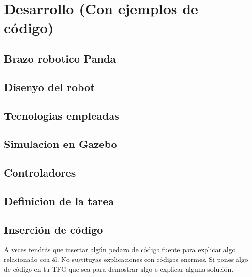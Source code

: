 
\chapter{Desarrollo (Con ejemplos de código)}
\label{desarrollo}

\section{Brazo robotico Panda}

\section{Disenyo del robot}

\section{Tecnologias empleadas}

\section{Simulacion en Gazebo}

\section{Controladores}

\section{Definicion de la tarea}


\section{Inserción de código}
A veces tendrás que insertar algún pedazo de código fuente para explicar algo relacionado con él. No sustituyas explicaciones con códigos enormes. Si pones algo de código en tu TFG que sea para demostrar algo o explicar alguna solución.

